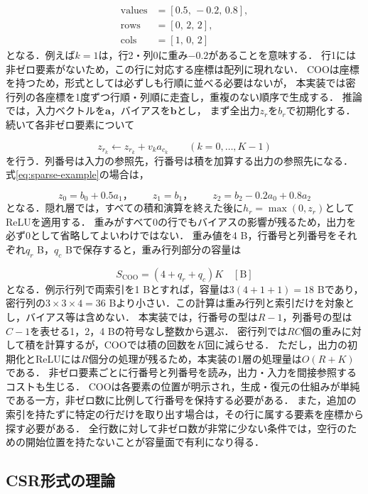 \documentclass[a4paper,11pt]{article}
\begin{document}
\[
    \begin{aligned}
        \text{values}&=[0.5,\,-0.2,\,0.8],\\
        \text{rows}&=[0,\,2,\,2],\\
        \text{cols}&=[1,\,0,\,2]
    \end{aligned}
\]
%
となる．例えば$k=1$は，行2・列0に重み$-0.2$があることを意味する．
行1には非ゼロ要素がないため，この行に対応する座標は配列に現れない．
COOは座標を持つため，形式としては必ずしも行順に並べる必要はないが，
本実装では密行列の各座標を1度ずつ行順・列順に走査し，重複のない順序で生成する．
推論では，入力ベクトルを$\boldsymbol{a}$，バイアスを$\boldsymbol{b}$とし，
まず全出力$z_r$を$b_r$で初期化する．続いて各非ゼロ要素について

\[
    z_{r_k}\leftarrow z_{r_k}+v_k a_{c_k}
    \qquad(k=0,\ldots,K-1)
\]
%
を行う．列番号は入力の参照先，行番号は積を加算する出力の参照先になる．
式\eqref{eq:sparse-example}の場合は，

\[
    z_0=b_0+0.5a_1，\qquad
    z_1=b_1，\qquad
    z_2=b_2-0.2a_0+0.8a_2
\]
%
となる．隠れ層では，すべての積和演算を終えた後に$h_r=\max(0,z_r)$としてReLUを適用する．
重みがすべて0の行でもバイアスの影響が残るため，出力を必ず0として省略してよいわけではない．
重み値を4 B，行番号と列番号をそれぞれ$q_r$ B，$q_c$ Bで保存すると，重み行列部分の容量は

\[
    S_{\mathrm{COO}}=(4+q_r+q_c)K\quad[\mathrm{B}]
\]
%
となる．例示行列で両索引を1 Bとすれば，容量は$3(4+1+1)=18$ Bであり，
密行列の$3\times3\times4=36$ Bより小さい．この計算は重み行列と索引だけを対象とし，バイアス等は含めない．
本実装では，行番号の型は$R-1$，列番号の型は$C-1$を表せる1，2，4 Bの符号なし整数から選ぶ．
密行列では$RC$個の重みに対して積を計算するが，COOでは積の回数を$K$回に減らせる．
ただし，出力の初期化とReLUには$R$個分の処理が残るため，本実装の1層の処理量は$O(R+K)$である．
非ゼロ要素ごとに行番号と列番号を読み，出力・入力を間接参照するコストも生じる．
COOは各要素の位置が明示され，生成・復元の仕組みが単純である一方，非ゼロ数に比例して行番号を保持する必要がある．
また，追加の索引を持たずに特定の行だけを取り出す場合は，その行に属する要素を座標から探す必要がある．
全行数に対して非ゼロ数が非常に少ない条件では，空行のための開始位置を持たないことが容量面で有利になり得る．

\Needspace{65mm}
\subsection{CSR形式の理論}\label{sec:csr-theory}
\end{document}

